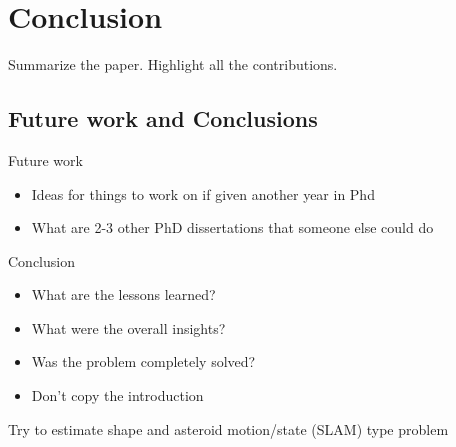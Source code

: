 
\chapter{Conclusion}\label{sec:conclusion}
Summarize the paper. 
Highlight all the contributions.

\section{Future work and Conclusions}

Future work
\begin{itemize}
    \item Ideas for things to work on if given another year in Phd
    \item What are 2-3 other PhD dissertations that someone else could do
\end{itemize}

Conclusion
\begin{itemize}
    \item What are the lessons learned?
    \item What were the overall insights?
    \item Was the problem completely solved? 
    \item Don't copy the introduction
\end{itemize}

Try to estimate shape and asteroid motion/state (SLAM) type problem
